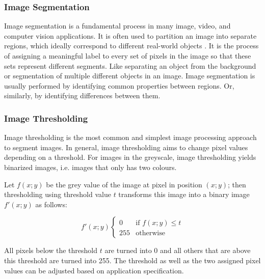 \subsubsection{Image Segmentation}
Image segmentation is a fundamental process in many image, video, and computer vision applications. It is often used to partition an image into separate regions, which ideally correspond to different real-world objects \parencite{imageSeg}. It is the process of assigning a meaningful label to every set of pixels in the image so that these sets represent different segments. Like separating an object from the background or segmentation of multiple different objects in an image. Image segmentation is usually performed by identifying common properties between regions. Or, similarly, by identifying differences between them.

\subsubsection{Image Thresholding}

Image thresholding is the most common and simplest image processing approach to segment images. In general, image thresholding aims to change pixel values depending on a threshold. For images in the greyscale, image thresholding yields binarized images, i.e. images that only has two colours. 

Let $f(x; y)$ be the grey value of the image at pixel in position $(x; y)$; then thresholding using threshold value $t$ transforms this image into a binary image $f'(x; y)$ as follows:

\begin{equation}
\mathcal{} f'(x; y)
  \begin{cases}
    0 & \text{if $f(x; y) \leq t$} \\

    255 & \text{otherwise}
  \end{cases}
\end{equation}

All pixels below the threshold $t$ are turned into 0 and all others that are above this threshold are turned into 255. The threshold as well as the two assigned pixel values can be adjusted based on application specification.

